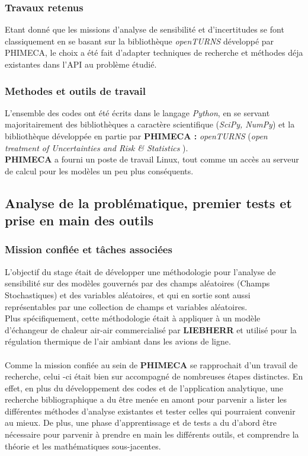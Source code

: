 \documentclass[a4paper,10pt]{article}
\begin{document}
\subsubsection{Travaux retenus}
Etant donné que les missions d'analyse de sensibilité et d'incertitudes se font classiquement en se basant sur la bibliothèque \textit{openTURNS} développé par PHIMECA, le choix a été fait d'adapter techniques de recherche et méthodes déja existantes dans l'API au problème étudié. 


\subsubsection{Methodes et outils de travail}
L'ensemble des codes ont été écrits dans le langage \textit{Python}, en se servant majoritairement des bibliothèques a caractère scientifique (\textit{SciPy, NumPy}) et la bibliothèque développée en partie par \textbf{PHIMECA :} \textit{openTURNS} (\emph{open treatment of Uncertainties and Risk \& Statistics })\cite{OpenTURNS}.\\
\textbf{PHIMECA} a fourni un poste de travail Linux, tout comme un accès au serveur de calcul pour les modèles un peu plus conséquents. \\

\subsection{Analyse de la problématique, premier tests et prise en main des outils}

\subsubsection{Mission confiée et tâches associées}
L'objectif du stage était de développer une méthodologie pour l'analyse de sensibilité sur des modèles gouvernés par des champs aléatoires (Champs Stochastiques) et des variables aléatoires, et qui en sortie sont aussi représentables par une collection de champs et variables aléatoires. \\
Plus spécifiquement, cette méthodologie était à appliquer à un modèle d'échangeur de chaleur air-air commercialisé par \textbf{LIEBHERR} et utilisé pour la régulation thermique de l'air ambiant dans les avions de ligne.\\\\
Comme la mission confiée au sein de \textbf{PHIMECA} se rapprochait d'un travail de recherche, celui -ci était bien sur accompagné de nombreuses étapes distinctes. En effet, en plus du développement des codes et de l'application analytique, une recherche bibliographique a du être menée en amont pour parvenir a lister les différentes méthodes d'analyse existantes et tester celles qui pourraient convenir au mieux. De plus, une phase d'apprentissage et de tests a du d'abord être nécessaire pour parvenir à prendre en main les différents outils, et comprendre la théorie et les mathématiques sous-jacentes.\\
\end{document}
